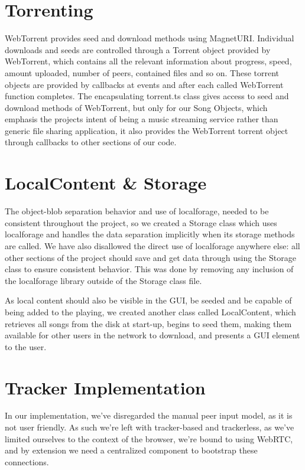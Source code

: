 \section{Torrenting}
WebTorrent provides seed and download methods using MagnetURI.
Individual downloads and seeds are controlled through a Torrent object provided by WebTorrent,
which contains all the relevant information about progress, 
speed, amount uploaded, number of peers, contained files and so on.
These torrent objects are provided by callbacks at events
and after each called WebTorrent function completes.
The encapsulating torrent.ts class gives access to seed and download methods of WebTorrent, 
but only for our Song Objects, which emphasis the projects intent of being a music streaming service 
rather than generic file sharing application, 
it also provides the WebTorrent torrent object through callbacks to other sections of our code.
\newline

\section{LocalContent \& Storage}
The object-blob separation behavior and use of localforage,
needed to be consistent throughout the project, 
so we created a Storage class which uses localforage and handles the data separation implicitly when its storage methods are called.
We have also disallowed the direct use of localforage anywhere else:
all other sections of the project should save and get data through using the Storage class to ensure consistent behavior. 
This was done by removing any inclusion of the localforage library outside of the Storage class file.

As local content should also be visible in the \acs{GUI}, 
be seeded and be capable of being added to the playing,
we created another class called LocalContent,
which retrieves all songs from the disk at start-up,
begins to seed them, making them available for other users in the network to download,
and presents a \acs{GUI} element to the user.

\section{Tracker Implementation}
In our implementation, we've disregarded the manual peer input model, as it is
not user friendly. As such we're left with tracker-based and trackerless, as 
we've limited ourselves to the context of the browser, we're bound to using 
WebRTC, and by extension we need a centralized component to bootstrap these
connections. 

